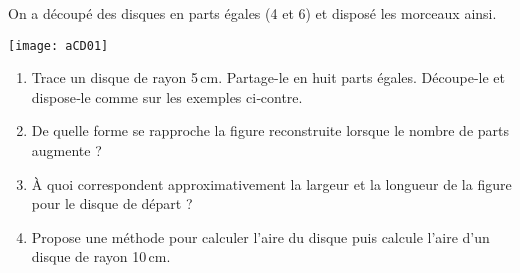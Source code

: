 \begin{activite}
On a découpé des disques en parts égales (4 et 6) et disposé les morceaux ainsi.

\begin{center}
    \texttt{[image: aCD01]}
\end{center}

\begin{enumerate}
    \item Trace un disque de rayon 5\,cm. Partage-le en huit parts égales. Découpe-le et dispose‑le comme sur les exemples ci‑contre.
    \item De quelle forme se rapproche la figure reconstruite lorsque le nombre de parts augmente ?
    \item À quoi correspondent approximativement la largeur et la longueur de la figure pour le disque de départ ?
    \item Propose une méthode pour calculer l'aire du disque puis calcule l'aire d'un disque de rayon 10\,cm.
\end{enumerate}
\end{activite}



